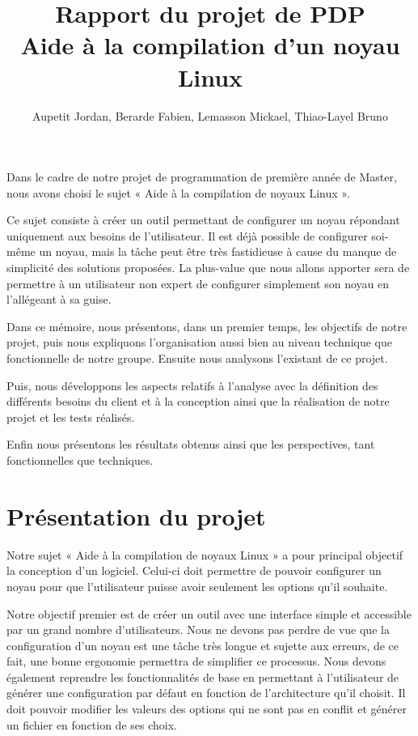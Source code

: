 \documentclass[16pts]{report}
\title{Rapport du projet de PDP \\ Aide à la compilation d'un noyau Linux}
\author{Aupetit Jordan, Berarde Fabien, Lemasson Mickael, Thiao-Layel Bruno}
\begin{document}
\maketitle
\clearpage
\tableofcontents
\clearpage

\nocite{*}

Dans le cadre de notre projet de programmation de première année de Master, 
nous avons choisi le sujet « Aide à la compilation de noyaux Linux ».

Ce sujet consiste à créer un outil permettant de configurer un noyau répondant 
uniquement aux besoins de l'utilisateur. Il est déjà possible de 
configurer soi-même un noyau, mais la tâche peut être très fastidieuse 
à cause du manque de simplicité des solutions proposées. La plus-value 
que nous allons apporter sera de permettre à un utilisateur non expert 
de configurer simplement son noyau en l'allégeant à sa guise.

Dans ce mémoire, nous présentons, dans un premier temps, les objectifs de 
notre projet, puis nous expliquons l’organisation aussi bien au niveau 
technique que fonctionnelle de notre groupe. Ensuite nous analysons l'existant 
de ce projet.

Puis, nous développons les aspects relatifs à l’analyse avec la définition 
des différents besoins du client et à la conception ainsi que la réalisation 
de notre projet et les tests réalisés.

Enfin nous présentons les résultats obtenus ainsi que les perspectives, 
tant fonctionnelles que techniques.


\chapter{Présentation du projet}
\label{cha:Présentation du projet}

Notre sujet « Aide à la compilation de noyaux Linux » a pour principal 
objectif la conception d'un logiciel. Celui-ci doit permettre de pouvoir 
configurer un noyau pour que l'utilisateur puisse avoir seulement les 
options qu'il souhaite. 

Notre objectif premier est de créer un outil avec une interface simple et 
accessible par un grand nombre d'utilisateurs. Nous ne devons pas perdre 
de vue que la configuration d'un noyau est une tâche très longue et 
sujette aux erreurs, de ce fait, une bonne ergonomie permettra de 
simplifier ce processus. Nous devons également reprendre les fonctionnalités 
de base en permettant à l'utilisateur de générer une configuration par 
défaut en fonction de l'architecture qu'il choisit. Il doit pouvoir 
modifier les valeurs des options qui ne sont pas en conflit et générer 
un fichier en fonction de ses choix.
\end{document}
